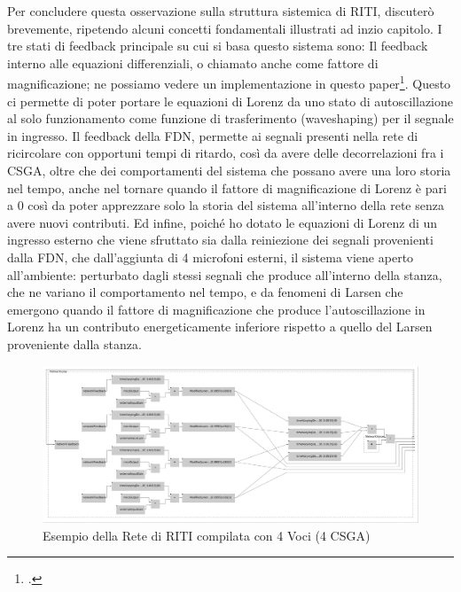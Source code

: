 Per concludere questa osservazione sulla struttura sistemica di RITI,
discuterò brevemente, ripetendo alcuni concetti fondamentali illustrati ad inzio capitolo.
I tre stati di feedback principale su cui si basa questo sistema sono:
Il feedback interno alle equazioni differenziali, o chiamato anche come fattore di magnificazione; 
ne possiamo vedere un implementazione in questo paper\footcite{liang_difference_2013}.
Questo ci permette di poter portare le equazioni di Lorenz da uno stato di autoscillazione al
solo funzionamento come funzione di trasferimento (waveshaping) per il segnale in ingresso.
Il feedback della FDN, permette ai segnali presenti nella rete di ricircolare
con opportuni tempi di ritardo, così da avere delle decorrelazioni fra i CSGA, oltre che dei comportamenti del sistema
che possano avere una loro storia nel tempo, anche nel tornare quando il fattore di magnificazione di Lorenz è pari a 0
così da poter apprezzare solo la storia del sistema all'interno della rete senza avere nuovi contributi.
Ed infine, poiché ho dotato le equazioni di Lorenz di un ingresso esterno che viene sfruttato
sia dalla reiniezione dei segnali provenienti dalla FDN, che dall'aggiunta di 4 microfoni esterni,
il sistema viene aperto all'ambiente: perturbato dagli stessi segnali che produce all'interno della stanza,
che ne variano il comportamento nel tempo, e da fenomeni di Larsen che emergono quando il fattore di 
magnificazione che produce l'autoscillazione in Lorenz ha un contributo energeticamente 
inferiore rispetto a quello del Larsen proveniente dalla stanza.
\clearpage

\begin{figure}[h!]
\begin{center}
    \includegraphics[width=15cm]{figures/RITI4VoiceNetwork.pdf} 
    \caption {Esempio della Rete di RITI compilata con 4 Voci (4 CSGA)}
\end{center}
\end{figure}

\vspace{0.5cm}

